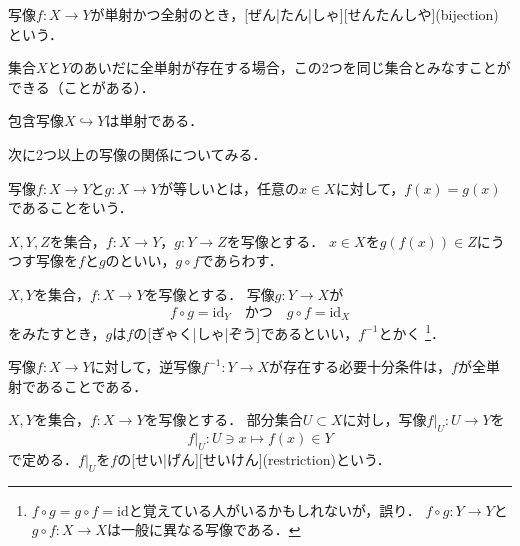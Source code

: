 \documentclass[../sotsu.tex]{subfiles}
\begin{document}
\begin{definition}[全単射]
    \label{dfn:bijection}
    写像$f \colon X \to Y$が単射かつ全射のとき，[ぜん|たん|しゃ][せんたんしや](bijection)という．
\end{definition}

集合$X$と$Y$のあいだに全単射が存在する場合，この2つを同じ集合とみなすことができる（ことがある）．

\begin{example}
    包含写像$X \hookrightarrow Y$は単射である．
\end{example}

次に2つ以上の写像の関係についてみる．

\begin{definition}[写像の一致]
    写像$f \colon X \to Y$と$g \colon X \to Y$が等しいとは，任意の$x \in X$に対して，$f(x) = g(x)$であることをいう．
\end{definition}

\begin{definition}[写像の合成]
    $X, Y, Z$を集合，$f \colon X \to Y$，$g \colon Y \to Z$を写像とする．
    $x \in X$を$g(f(x)) \in Z$にうつす写像を$f$と$g$のといい，$g \circ f$であらわす．
\end{definition}


\begin{definition}[逆写像]
    \label{dfn:inverse-map}
    $X, Y$を集合，$f \colon X \to Y$を写像とする．
    写像$g \colon Y \to X$が
    \[  f \circ g = \mathrm{id}_Y  \quad \text{かつ} \quad  g \circ f = \mathrm{id}_X  \]
    をみたすとき，$g$は$f$の[ぎゃく|しゃ|ぞう]であるといい，$f^{-1}$とかく%
    \footnote{
        $f \circ g = g \circ f = \mathrm{id}$と覚えている人がいるかもしれないが，誤り．
        $f \circ g \colon Y \to Y$と$g \circ f \colon X \to X$は一般に異なる写像である．
    }．
\end{definition}

\begin{theorem}
    \label{thm:inverse-map-exists-iff}
    写像$f \colon X \to Y$に対して，逆写像$f^{-1} \colon Y \to X$が存在する必要十分条件は，$f$が全単射であることである．
\end{theorem}


\begin{definition}[写像の制限]
    \label{dfn:restriction}
    $X, Y$を集合，$f \colon X \to Y$を写像とする．
    部分集合$U \subset X$に対し，写像$f \vert_{U} \colon U \to Y$を
    \begin{equation*}
        f \vert_U  \colon  U \ni x \longmapsto f(x) \in Y
    \end{equation*}
    で定める．$f \vert_U$を$f$の[せい|げん][せいけん](restriction)という．
\end{definition}
\end{document}
